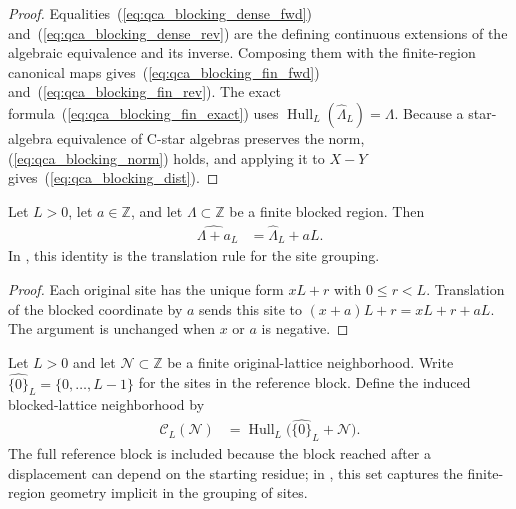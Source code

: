\begin{proof}\leanok
    Equalities~(\ref{eq:qca_blocking_dense_fwd}) and~(\ref{eq:qca_blocking_dense_rev}) are the defining continuous extensions of the algebraic equivalence and its inverse.
    Composing them with the finite-region canonical maps gives~(\ref{eq:qca_blocking_fin_fwd}) and~(\ref{eq:qca_blocking_fin_rev}).
    The exact formula~(\ref{eq:qca_blocking_fin_exact}) uses $\operatorname{Hull}_L(\widehat\Lambda_L)=\Lambda$.
    Because a star-algebra equivalence of C-star algebras preserves the norm, (\ref{eq:qca_blocking_norm}) holds, and applying it to $X-Y$ gives~(\ref{eq:qca_blocking_dist}).
\end{proof}

\begin{lemma}
    \label{lem:qca_expanded_region_translation}
    \leanok
    Let $L>0$, let $a\in\mathbb Z$, and let $\Lambda\subset\mathbb Z$ be a
    finite blocked region.  Then
    \begin{align}
        \widehat{\Lambda+a}_L
         & =\widehat\Lambda_L+aL.
    \end{align}
    In \cite[lines~2308 and 2313--2320]{Cirac2017MPU}, this identity is the translation rule for the site
    grouping.
\end{lemma}

\begin{proof}\leanok
    Each original site has the unique form $xL+r$ with $0\leq r<L$.
    Translation of the blocked coordinate by $a$ sends this site to
    $(x+a)L+r=xL+r+aL$.  The argument is unchanged when $x$ or $a$ is
    negative.
\end{proof}

\begin{definition}
    \label{def:qca_blocked_neighborhood}
    \leanok
    Let $L>0$ and let $\mathcal N\subset\mathbb Z$ be a finite original-lattice
    neighborhood.  Write $\widehat{\{0\}}_L=\{0,\ldots,L-1\}$ for the sites in
    the reference block.  Define the induced blocked-lattice neighborhood by
    \begin{align}
        \mathcal C_L(\mathcal N)
         & =\operatorname{Hull}_L
        \bigl(\widehat{\{0\}}_L+\mathcal N\bigr).
    \end{align}
    The full reference block is included because the block reached after a
    displacement can depend on the starting residue; in \cite[lines~2308 and 2313--2320]{Cirac2017MPU}, this set captures the finite-region
    geometry implicit in the grouping of
    sites.
\end{definition}

